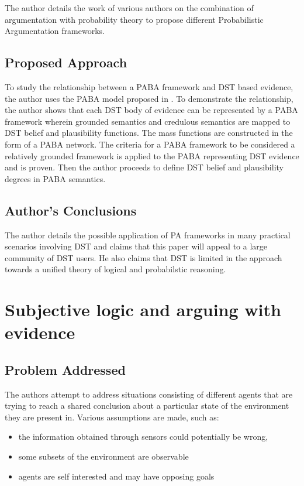 \documentclass[UTF8]{article}
\begin{document}
The author details the work of various authors on the combination of argumentation with probability theory to propose different Probabilistic Argumentation frameworks. 

\subsection{Proposed Approach}
To study the relationship between a PABA framework and DST based evidence, the author uses the PABA model proposed in \cite{Dung:2010:TAJ:1860828.1860846}. To demonstrate the relationship, 
the author shows that each DST body of evidence can be represented by a PABA framework wherein grounded semantics and credulous semantics are mapped to DST belief and plausibility functions. The mass functions are 
constructed in the form of a PABA network.  The criteria for a PABA framework to be considered a relatively grounded framework is applied to the PABA representing DST evidence and is proven. Then the author proceeds to define DST belief and plausibility degrees in PABA semantics.

\subsection{Author's Conclusions}
The author details the possible application of PA frameworks in many practical scenarios involving 
DST and claims that this paper will appeal to a large community of DST users. He also claims that DST is limited in the approach towards a unified theory of logical and probabilstic reasoning.
\section{Subjective logic and arguing with evidence}
\subsection{Problem Addressed}
The authors attempt to address situations consisting of different agents that are trying to reach a shared conclusion about a particular state of the environment 
they are present in. Various assumptions are made, such as: 
\begin{itemize}
  \item the information obtained through sensors could potentially be wrong, 
  \item some subsets of the environment are observable
  \item agents are self interested and may have opposing goals 
\end{itemize}
\end{document}
